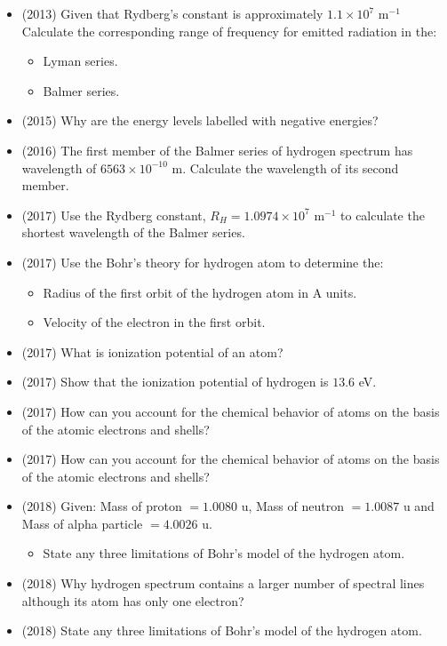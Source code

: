 \documentclass{article}
\begin{document}
\begin{itemize}
\begin{itemize}
\end{itemize}
\item (2013)  Given that Rydberg’s constant is approximately $ 1.1 \times 10^{7}$ m$ ^{-1}$ Calculate the corresponding range of frequency for emitted radiation in the:
 \begin{itemize}
\item Lyman series. 
\item Balmer series. 
\end{itemize}
\item (2015)  Why are the energy levels labelled with negative energies?
\item (2016)  The first member of the Balmer series of hydrogen spectrum has wavelength of $ 6563 \times 10^{-10}$ m. Calculate the wavelength of its second member.
\item (2017)  Use the Rydberg constant, $ R_{H}=1.0974 \times 10^{7}$ m$ ^{-1}$ to calculate the shortest wavelength of the Balmer series. 
\item (2017)  Use the Bohr's theory for hydrogen atom to determine the:
 \begin{itemize}
\item Radius of the first orbit of the hydrogen atom in A units. 
\item Velocity of the electron in the first orbit. 
\end{itemize}
\item (2017)  What is ionization potential of an atom?
\item (2017)  Show that the ionization potential of hydrogen is $ 13.6$ eV. 
\item (2017)  How can you account for the chemical behavior of atoms on the basis of the atomic electrons and shells? 
\item (2017)  How can you account for the chemical behavior of atoms on the basis of the atomic electrons and shells? 
\item (2018)  Given: Mass of proton $ =1.0080$ u, Mass of neutron $ =1.0087$ u and Mass of alpha particle $ =4.0026$ u.
 \begin{itemize}
\item State any three limitations of Bohr’s model of the hydrogen atom.
\end{itemize}
\item (2018)  Why hydrogen spectrum contains a larger number of spectral lines although its  atom has only one electron? 
\item (2018)  State any three limitations of Bohr’s model of the hydrogen atom.

\end{itemize}
\end{document}
